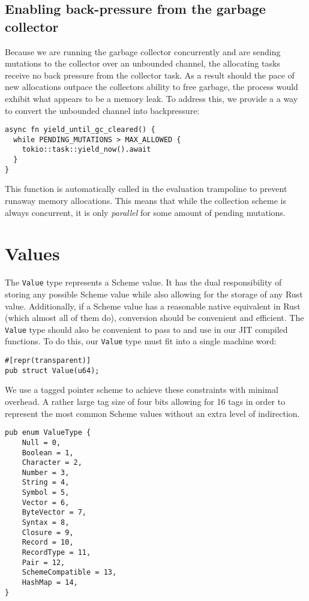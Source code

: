 \documentclass[sigplan]{acmart}
\begin{document}
\subsection{Enabling back-pressure from the garbage collector}

Because we are running the garbage collector concurrently and are sending
mutations to the collector over an unbounded channel, the allocating tasks
receive no back pressure from the collector task. As a result should the pace
of new allocations outpace the collectors ability to free garbage, the process
would exhibit what appears to be a memory leak. To address this, we provide a
a way to convert the unbounded channel into backpressure:

\begin{verbatim}
async fn yield_until_gc_cleared() {
  while PENDING_MUTATIONS > MAX_ALLOWED {
    tokio::task::yield_now().await
  }
}
\end{verbatim}

This function is automatically called in the evaluation trampoline to prevent
runaway memory allocations. This means that while the collection scheme is
always concurrent, it is only \textit{parallel} for some amount of pending
mutations.

\section{Values}

The \texttt{Value} type represents a Scheme value. It has the dual responsibility
of storing any possible Scheme value while also allowing for the storage of any
Rust value. Additionally, if a Scheme value has a reasonable native equivalent
in Rust (which almost all of them do), conversion should be convenient and
efficient. The \texttt{Value} type should also be convenient to pass to and
use in our JIT compiled functions. To do this, our \texttt{Value} type must fit
into a single machine word:

\begin{verbatim}
#[repr(transparent)]
pub struct Value(u64);
\end{verbatim}

We use a tagged pointer \cite{tags} scheme to achieve these constraints with
minimal overhead. A rather large tag size of four bits allowing for 16 tags in
order to represent the most common Scheme values without an extra level of
indirection.

\begin{verbatim}
pub enum ValueType {
    Null = 0,
    Boolean = 1,
    Character = 2,
    Number = 3,
    String = 4,
    Symbol = 5,
    Vector = 6,
    ByteVector = 7,
    Syntax = 8,
    Closure = 9,
    Record = 10,
    RecordType = 11,
    Pair = 12,
    SchemeCompatible = 13,
    HashMap = 14,
}
\end{verbatim}
\end{document}
